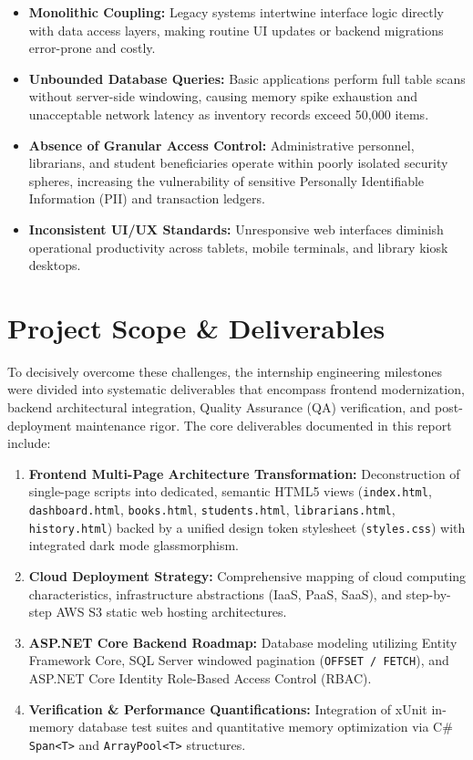 \documentclass[11pt,a4paper]{report}
\begin{document}
\begin{itemize}[leftmargin=1.5em]
    \item \textbf{Monolithic Coupling:} Legacy systems intertwine interface logic directly with data access layers, making routine UI updates or backend migrations error-prone and costly.
    \item \textbf{Unbounded Database Queries:} Basic applications perform full table scans without server-side windowing, causing memory spike exhaustion and unacceptable network latency as inventory records exceed 50,000 items.
    \item \textbf{Absence of Granular Access Control:} Administrative personnel, librarians, and student beneficiaries operate within poorly isolated security spheres, increasing the vulnerability of sensitive Personally Identifiable Information (PII) and transaction ledgers.
    \item \textbf{Inconsistent UI/UX Standards:} Unresponsive web interfaces diminish operational productivity across tablets, mobile terminals, and library kiosk desktops.
\end{itemize}

\section{Project Scope \& Deliverables}
To decisively overcome these challenges, the internship engineering milestones were divided into systematic deliverables that encompass frontend modernization, backend architectural integration, Quality Assurance (QA) verification, and post-deployment maintenance rigor. The core deliverables documented in this report include:

\begin{enumerate}[leftmargin=1.5em]
    \item \textbf{Frontend Multi-Page Architecture Transformation:} Deconstruction of single-page scripts into dedicated, semantic HTML5 views (\texttt{index.html}, \texttt{dashboard.html}, \texttt{books.html}, \texttt{students.html}, \texttt{librarians.html}, \texttt{history.html}) backed by a unified design token stylesheet (\texttt{styles.css}) with integrated dark mode glassmorphism.
    \item \textbf{Cloud Deployment Strategy:} Comprehensive mapping of cloud computing characteristics, infrastructure abstractions (IaaS, PaaS, SaaS), and step-by-step AWS S3 static web hosting architectures.
    \item \textbf{ASP.NET Core Backend Roadmap:} Database modeling utilizing Entity Framework Core, SQL Server windowed pagination (\texttt{OFFSET / FETCH}), and ASP.NET Core Identity Role-Based Access Control (RBAC).
    \item \textbf{Verification \& Performance Quantifications:} Integration of xUnit in-memory database test suites and quantitative memory optimization via C\# \texttt{Span<T>} and \texttt{ArrayPool<T>} structures.
\end{enumerate}
\end{document}
